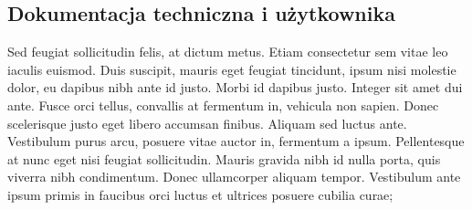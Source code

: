 \subsection{Dokumentacja techniczna i użytkownika}
\begin{spacing}{1.5} %
    Sed feugiat sollicitudin felis, at dictum metus. Etiam consectetur sem vitae leo iaculis euismod. Duis suscipit, mauris eget feugiat tincidunt, ipsum nisi molestie dolor, eu dapibus nibh ante id justo. Morbi id dapibus justo. Integer sit amet dui ante. Fusce orci tellus, convallis at fermentum in, vehicula non sapien. Donec scelerisque justo eget libero accumsan finibus. Aliquam sed luctus ante. Vestibulum purus arcu, posuere vitae auctor in, fermentum a ipsum. Pellentesque at nunc eget nisi feugiat sollicitudin. Mauris gravida nibh id nulla porta, quis viverra nibh condimentum. Donec ullamcorper aliquam tempor. Vestibulum ante ipsum primis in faucibus orci luctus et ultrices posuere cubilia curae; 
\end{spacing} %
